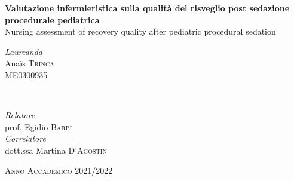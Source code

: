 \begin{titlepage}
\begin{center}
	
	
	\vfill
	
	{\huge\bfseries Valutazione infermieristica sulla qualità del risveglio post sedazione procedurale pediatrica}\\ [0.2cm] %
	
	{\huge Nursing assessment of recovery quality after pediatric procedural sedation}\\ [0.2cm] %
	
	\vfill\vfill
	
	
	\begin{minipage}{0.4\textwidth}
		\begin{flushleft}
			\large
			\textit{Laureanda}\\
			Ana\"is \textsc{Trinca}\\ %
			\small{ME0300935}
		\end{flushleft}
	\end{minipage}
	~
	\begin{minipage}{0.4\textwidth}
		\begin{flushright}
			\large
			\textit{Relatore}\\
			prof. Egidio \textsc{Barbi} \\ %
			\bigskip
			\textit{Correlatore}\\ 
			dott.ssa Martina \textsc{D'Agostin} \\ %
		\end{flushright}
	\end{minipage}
	
	
	\vfill\vfill\vfill
	
	{\large \textsc{Anno Accademico 2021/2022}}
	
	\vfill
	\end{center}
\end{titlepage}

